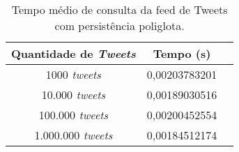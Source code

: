 \begin{table}[H]
    \centering
    \caption[Tempo médio de consulta da feed de Tweets com persistência poliglota]{Tempo médio de consulta da feed de Tweets com persistência poliglota.\label{tab:tempo_feed_poli}}
    \begin{tabular}{ccc}
        \hline
            Quantidade de \textit{Tweets} & Tempo (s) \\
        \hline
            1000 \textit{tweets} &   0,00203783201 \\
            10.000 \textit{tweets} & 0,00189030516 \\
            100.000 \textit{tweets} & 0,00200452554 \\
            1.000.000 \textit{tweets} & 0,00184512174 \\
        \hline
    \end{tabular}
\end{table}

